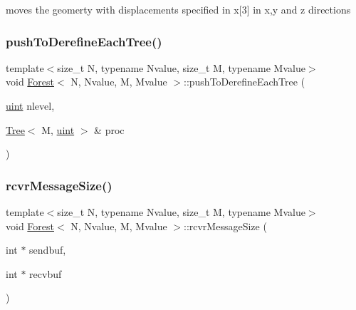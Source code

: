 moves the geomerty with displacements specified in x\mbox{[}3\mbox{]} in x,y and z directions \mbox{\label{classForest_a9d98b98639826d2b1f4ea740879b6f53}} 
\subsubsection{\texorpdfstring{push\+To\+Derefine\+Each\+Tree()}{pushToDerefineEachTree()}}
{\footnotesize\ttfamily template$<$size\+\_\+t N, typename Nvalue, size\+\_\+t M, typename Mvalue$>$ \\
void \mbox{\hyperlink{classForest}{Forest}}$<$ N, Nvalue, M, Mvalue $>$\+::push\+To\+Derefine\+Each\+Tree (\begin{DoxyParamCaption}\item[{\mbox{\hyperlink{definitions_8h_a69aa29b598b851b0640aa225a9e5d61d}{uint}}}]{nlevel,  }\item[{\mbox{\hyperlink{classTree}{Tree}}$<$ M, \mbox{\hyperlink{definitions_8h_a69aa29b598b851b0640aa225a9e5d61d}{uint}} $>$ \&}]{proc }\end{DoxyParamCaption})}

\mbox{\label{classForest_aaffbfa6fb511fd1f0fd0ac7d7f95e9a2}} 
\subsubsection{\texorpdfstring{rcvr\+Message\+Size()}{rcvrMessageSize()}}
{\footnotesize\ttfamily template$<$size\+\_\+t N, typename Nvalue, size\+\_\+t M, typename Mvalue$>$ \\
void \mbox{\hyperlink{classForest}{Forest}}$<$ N, Nvalue, M, Mvalue $>$\+::rcvr\+Message\+Size (\begin{DoxyParamCaption}\item[{int $\ast$}]{sendbuf,  }\item[{int $\ast$}]{recvbuf }\end{DoxyParamCaption})}

\mbox{\label{classForest_a563e088c635b27f95fbdc4ceb82052f5}} 
